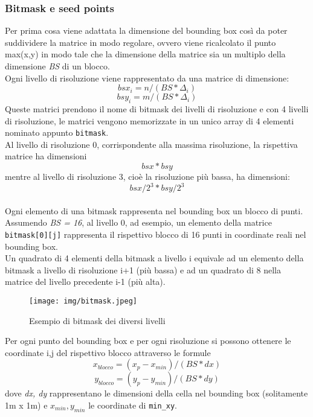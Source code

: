 			\subsubsection{Bitmask e seed points}
				Per prima cosa viene adattata la dimensione del bounding box cos\`{i} da poter suddividere la matrice in modo regolare, ovvero viene ricalcolato il punto max(x,y) in modo tale che la dimensione della matrice sia un multiplo della dimensione \textit{BS} di un blocco.\\
				Ogni livello di risoluzione viene rappresentato da una matrice di dimensione:\\
				\[
					bsx_i = n / (BS * \Delta_i)
				\]
				\[
					bsy_i = m / (BS * \Delta_i) 
				\]
				Queste matrici prendono il nome di bitmask dei livelli di risoluzione e con 4 livelli di risoluzione, le matrici vengono memorizzate in un unico array di 4 elementi nominato appunto \texttt{bitmask}.\\
				Al livello di risoluzione 0, corrispondente alla massima risoluzione, la rispettiva matrice ha dimensioni \[bsx * bsy\] mentre al livello di risoluzione 3, cio\`{e} la risoluzione pi\`{u} bassa, ha dimensioni: \[bsx/2^3 * bsy/2^3\] \\
				Ogni elemento di una bitmask rappresenta nel bounding box un blocco di punti. Assumendo \textit{BS = 16}, al livello 0, ad esempio, un elemento della matrice \texttt{bitmask[0][j]} rappresenta il rispettivo blocco di 16 punti in coordinate reali nel bounding box.\\
				Un quadrato di 4 elementi della bitmask a livello i equivale ad un elemento della bitmask a livello di risoluzione i+1 (pi\`{u} bassa) e ad un quadrato di 8 nella matrice del livello precedente i-1 (pi\`{u} alta). 
				\newpage
				\begin{figure}[ht]
					\centering
					\texttt{[image: img/bitmask.jpeg]}
					\caption{Esempio di bitmask dei diversi livelli}
				\end{figure}
				Per ogni punto del bounding box e per ogni risoluzione si possono ottenere le coordinate i,j del rispettivo blocco attraverso le formule
				\[
					x_{blocco} = (x_p - x_{min}) / (BS * dx) 
				\]
				\[
					y_{blocco} = (y_p - y_{min}) / (BS * dy) 
				\]
				dove \textit{dx, dy} rappresentano le dimensioni della cella nel bounding box (solitamente 1m x 1m) e $x_{min}, y_{min}$ le coordinate di \texttt{min\_xy}.\\
